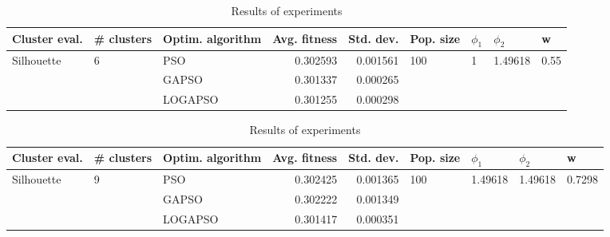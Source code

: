 \documentclass{article}
\begin{document}
\begin{table}
\centering
\caption{Results of experiments}
\begin{tabular}{lllrrllll}
\toprule
              Cluster eval. &        \# clusters & Optim. algorithm &  Avg. fitness &  Std. dev. &            Pop. size &         $\phi_{1}$ &               $\phi_{2}$ &                     w \\
\midrule
\multirow{3}{*}{Silhouette} & \multirow{3}{*}{6} &              PSO &      0.302593 &   0.001561 & \multirow{3}{*}{100} & \multirow{3}{*}{1} & \multirow{3}{*}{1.49618} & \multirow{3}{*}{0.55} \\
                            &                    &            GAPSO &      0.301337 &   0.000265 &                      &                    &                          &                       \\
                            &                    &          LOGAPSO &      0.301255 &   0.000298 &                      &                    &                          &                       \\
\bottomrule
\end{tabular}
\end{table}
\begin{table}
\centering
\caption{Results of experiments}
\begin{tabular}{lllrrllll}
\toprule
              Cluster eval. &        \# clusters & Optim. algorithm &  Avg. fitness &  Std. dev. &            Pop. size &               $\phi_{1}$ &               $\phi_{2}$ &                       w \\
\midrule
\multirow{3}{*}{Silhouette} & \multirow{3}{*}{9} &              PSO &      0.302425 &   0.001365 & \multirow{3}{*}{100} & \multirow{3}{*}{1.49618} & \multirow{3}{*}{1.49618} & \multirow{3}{*}{0.7298} \\
                            &                    &            GAPSO &      0.302222 &   0.001349 &                      &                          &                          &                         \\
                            &                    &          LOGAPSO &      0.301417 &   0.000351 &                      &                          &                          &                         \\
\bottomrule
\end{tabular}
\end{table}
\end{document}
